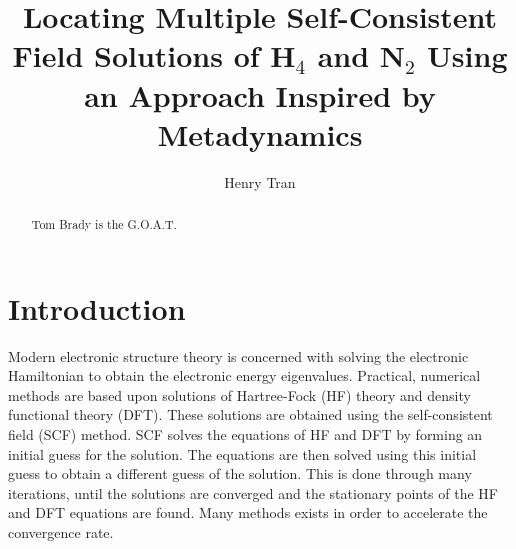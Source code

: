 \documentclass[final,3p,times,twocolumn]{elsarticle}
\begin{document}
\begin{frontmatter}



\title{Locating Multiple Self-Consistent Field Solutions of H$_4$ and N$_2$ Using an Approach Inspired by Metadynamics}


\author{Henry Tran}

\address{Department of Chemistry, Lensfield Road, Cambridge, UK,
CB2 1EW}

\begin{abstract}
Tom Brady is the G.O.A.T.
\end{abstract}

\end{frontmatter}


\section{Introduction} \label{sec:intro}
Modern electronic structure theory is concerned with solving the electronic Hamiltonian to obtain the electronic energy eigenvalues. Practical, numerical methods are based upon solutions of Hartree-Fock (HF) theory\cite{hartree,fock,slater} and density functional theory (DFT).\cite{dft1,dft1} These solutions are obtained using the self-consistent field (SCF) method.\cite{hartree,szabo,scf} SCF solves the equations of HF and DFT by forming an initial guess for the solution. The equations are then solved using this initial guess to obtain a different guess of the solution. This is done through many iterations, until the solutions are converged and the stationary points of the HF and DFT equations are found. Many methods exists in order to accelerate the convergence rate.\cite{diis}
\end{document}
